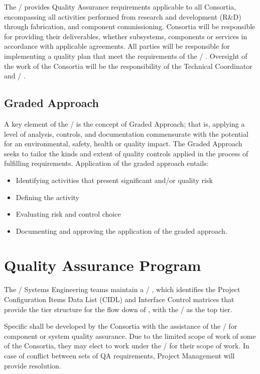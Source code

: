 The /  provides Quality Assurance requirements
applicable to all Consortia, encompassing all activities performed
from research and development (R\&D) through fabrication, and component
commissioning. Consortia will be responsible for providing their
deliverables, whether subsystems, components or services in accordance
with applicable agreements. All parties will be responsible for
implementing a quality plan that meet the requirements of the
/ . Oversight of the work of the Consortia will be
the responsibility of the  Technical Coordinator and / .

\subsection{Graded Approach}

A key element of the /  is the concept of Graded
Approach; that is, applying a level of analysis, controls, and
documentation commensurate with the potential for an environmental,
safety, health or quality impact. The Graded Approach seeks to tailor
the kinds and extent of quality controls applied in the process of
fulfilling requirements. Application of the graded approach entails:
\begin{itemize}
 \item Identifying activities that present significant  and/or quality risk
 \item Defining the activity
 \item Evaluating risk and control choice
 \item Documenting and approving the application of the graded approach.
\end{itemize}

\section{Quality Assurance Program}

The / Systems Engineering teams maintain a /
, which identifies the Project
Configuration Items Data List (CIDL) and Interface Control matrices
that provide the tier structure for the flow down of , with
the /  as the top tier.

Specific  shall be developed by the Consortia with the
assistance of the /  for
component or system quality assurance. Due to the limited scope of
work of some of the Consortia, they may elect to work under the
/  for their scope of work. In case of conflict between
sets of QA requirements,  Project Management will provide
resolution.

